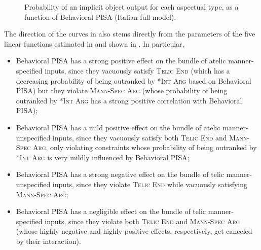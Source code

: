 \begin{figure}[htb]
\caption{Probability of an implicit object output for each aspectual type, as a function of Behavioral PISA (Italian full model).}
    
\end{figure}

The direction of the curves in  also stems directly from the parameters of the five linear functions estimated in  and shown in . In particular,
\begin{itemize}
    \item Behavioral PISA has a strong positive effect on the bundle of atelic manner-specified inputs, since they vacuously satisfy \textsc{Telic End} (which has a decreasing probability of being outranked by \textsc{*Int Arg} based on Behavioral PISA) but they violate \textsc{Mann-Spec Arg} (whose probability of being outranked by \textsc{*Int Arg} has a strong positive correlation with Behavioral PISA);
    \item Behavioral PISA has a mild positive effect on the bundle of atelic manner-unspecified inputs, since they vacuously satisfy both \textsc{Telic End} and \textsc{Mann-Spec Arg}, only violating constraints whose probability of being outranked by \textsc{*Int Arg} is very mildly influenced by Behavioral PISA;
    \item Behavioral PISA has a strong negative effect on the bundle of telic manner-unspecified inputs, since they violate \textsc{Telic End} while vacuously satisfying \textsc{Mann-Spec Arg};
    \item Behavioral PISA has a negligible effect on the bundle of telic manner-specified inputs, since they violate both \textsc{Telic End} and \textsc{Mann-Spec Arg} (whose highly negative and highly positive effects, respectively, get canceled by their interaction).
\end{itemize}

